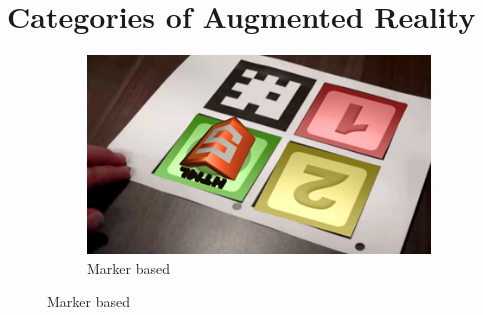 \documentclass[12 pct]{report}
\begin{document}
\section{Categories of Augmented Reality}
\begin{figure}[h!]
  \centering
  \begin{subfigure}[b]{0.36\linewidth}
    \includegraphics[width=\linewidth]{marker-based}
     \caption{Marker based \cite{wagner2003first}}
     

\end{subfigure}
\end{figure}
\end{document}
